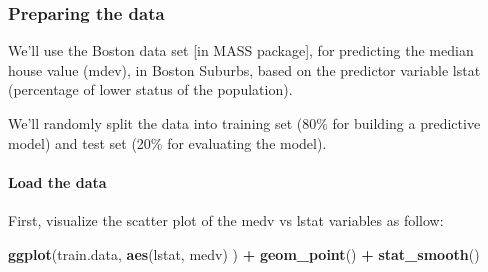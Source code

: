 \documentclass[]{article}
\newenvironment{Shaded}{\begin{snugshade}}{\end{snugshade}}
\newcommand{\CommentTok}[1]{\textcolor[rgb]{0.56,0.35,0.01}{\textit{#1}}}
\newcommand{\DataTypeTok}[1]{\textcolor[rgb]{0.13,0.29,0.53}{#1}}
\newcommand{\DecValTok}[1]{\textcolor[rgb]{0.00,0.00,0.81}{#1}}
\newcommand{\FloatTok}[1]{\textcolor[rgb]{0.00,0.00,0.81}{#1}}
\newcommand{\KeywordTok}[1]{\textcolor[rgb]{0.13,0.29,0.53}{\textbf{#1}}}
\newcommand{\NormalTok}[1]{#1}
\newcommand{\OperatorTok}[1]{\textcolor[rgb]{0.81,0.36,0.00}{\textbf{#1}}}
\newcommand{\OtherTok}[1]{\textcolor[rgb]{0.56,0.35,0.01}{#1}}
\newcommand{\StringTok}[1]{\textcolor[rgb]{0.31,0.60,0.02}{#1}}
\let\oldparagraph\paragraph
\renewcommand{\paragraph}[1]{\oldparagraph{#1}\mbox{}}
\begin{document}
\hypertarget{preparing-the-data}{%
\subsubsection{Preparing the data}\label{preparing-the-data}}

We'll use the Boston data set {[}in MASS package{]}, for predicting the
median house value (mdev), in Boston Suburbs, based on the predictor
variable lstat (percentage of lower status of the population).

We'll randomly split the data into training set (80\% for building a
predictive model) and test set (20\% for evaluating the model).

\hypertarget{load-the-data}{%
\paragraph{Load the data}\label{load-the-data}}

\begin{Shaded}
\end{Shaded}

First, visualize the scatter plot of the medv vs lstat variables as
follow:

\begin{Shaded}
\begin{Highlighting}[]
\KeywordTok{ggplot}\NormalTok{(train.data, }\KeywordTok{aes}\NormalTok{(lstat, medv) ) }\OperatorTok{+}
\StringTok{  }\KeywordTok{geom_point}\NormalTok{() }\OperatorTok{+}
\StringTok{  }\KeywordTok{stat_smooth}\NormalTok{()}
\end{Highlighting}
\end{Shaded}
\end{document}
